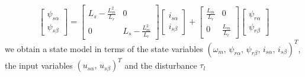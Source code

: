 \documentclass[11pt,a4paper,oneside]{book}
\numberwithin{equation}{section}
\theoremstyle{it}
\theoremstyle{definition}
\begin{document}
\begin{equation}\label{eq51}
	\left[\begin{matrix}
		\psi_{s\alpha} \\[6pt]
		\psi_{s\beta}
	\end{matrix}\right] = 
	\left[\begin{matrix}
		L_s-\frac{L_m^2}{L_r} & 0 \\[6pt]
		0 & L_s-\frac{L_m^2}{L_r}
	\end{matrix}\right]
	\left[\begin{matrix}
		i_{s\alpha} \\[6pt]
		i_{s\beta}
	\end{matrix}\right]+
	\left[\begin{matrix}
		\frac{L_m}{L_r} & 0 \\[6pt]
		0 & \frac{L_m}{L_r}
	\end{matrix}\right]
	\left[\begin{matrix}
		\psi_{r\alpha} \\[6pt]
		\psi_{r\beta}
	\end{matrix}\right]
\end{equation}
we obtain a state model in terms of the state variables 
$\left(\omega_m,\,\psi_{r\alpha},\, 
\psi_{r\beta},\,i_{s\alpha},\,i_{s\beta}\right)^T$, the input variables 
$\left(u_{s\alpha},\, u_{s\beta}\right)^T$ and the disturbance $\tau_l$
\end{document}
